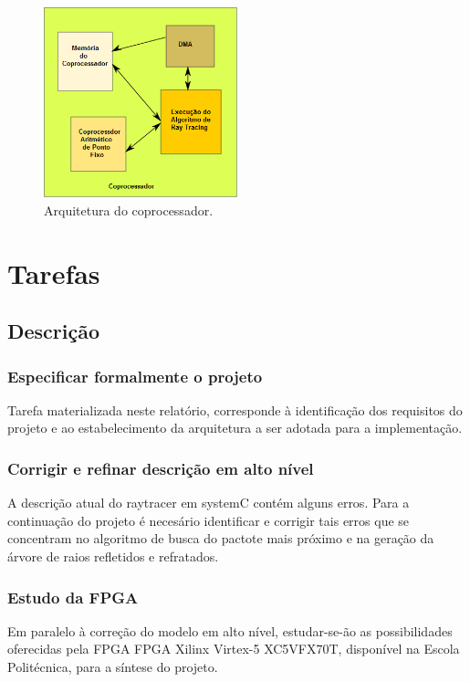 \documentclass[a4paper,12pt]{article}
\begin{document}
\begin{figure}[htbp]
  \centering
  \includegraphics[width=0.5\textwidth]{figures/archi_coproc}
  \caption{Arquitetura do coprocessador.}
  \label{fig:archi_coproc}
\end{figure}

\section{Tarefas}
\subsection{Descrição}
\subsubsection{Especificar formalmente o projeto}
Tarefa materializada neste relatório, corresponde à identificação dos requisitos
do projeto e ao estabelecimento da arquitetura a ser adotada para a
implementação.

\subsubsection{Corrigir e refinar descrição em alto nível}
A descrição atual do raytracer em systemC contém alguns erros. Para a continuação do projeto é necesário identificar e corrigir tais erros que se concentram no algoritmo de busca do pactote mais próximo e na geração da árvore de raios refletidos e refratados.

\subsubsection{Estudo da FPGA}
Em paralelo à correção do modelo em alto nível, estudar-se-ão as possibilidades oferecidas pela FPGA FPGA Xilinx Virtex-5 XC5VFX70T, disponível na Escola Politécnica, para a síntese do projeto.
\end{document}
